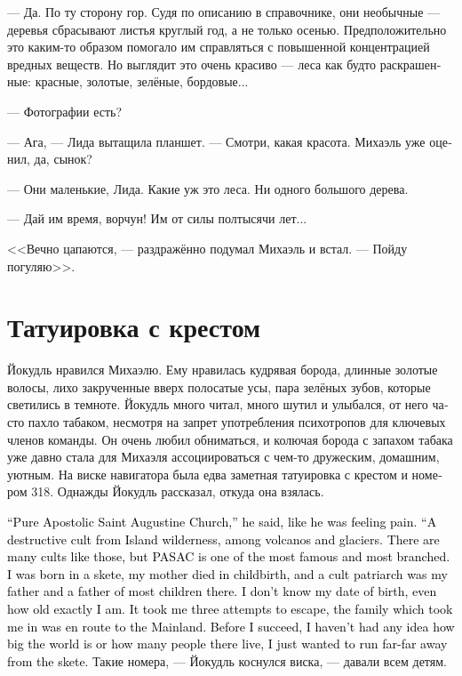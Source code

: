 \documentclass[a4paper,12pt,fleqn]{book}\usepackage{cooltooltips}\usepackage{polyglossia}\setdefaultlanguage[babelshorthands=true]{russian}\setotherlanguage{english}\defaultfontfeatures{Ligatures=TeX,Mapping=tex-text} \usepackage{xcolor}\definecolor{lightgray}{HTML}{bbbbbb}\color{lightgray}\newcommand{\ml}[3]{\textenglish{\textcolor{black}{#3}}}
\begin{document}
--- Да.
По ту сторону гор.
Судя по описанию в справочнике, они необычные --- деревья сбрасывают листья круглый год, а не только осенью.
Предположительно это каким-то образом помогало им справляться с повышенной концентрацией вредных веществ.
Но выглядит это очень красиво --- леса как будто раскрашенные: красные, золотые, зелёные, бордовые...

--- Фотографии есть?

--- Ага, --- Лида вытащила планшет.
--- Смотри, какая красота.
Михаэль уже оценил, да, сынок?

--- Они маленькие, Лида.
Какие уж это леса.
Ни одного большого дерева.

--- Дай им время, ворчун!
Им от силы полтысячи лет...

<<Вечно цапаются, --- раздражённо подумал Михаэль и встал.
--- Пойду погуляю>>.

\section{Татуировка с крестом}

Йокудль нравился Михаэлю.
Ему нравилась кудрявая борода, длинные золотые волосы, лихо закрученные вверх полосатые усы, пара зелёных зубов, которые светились в темноте.
Йокудль много читал, много шутил и улыбался, от него часто пахло табаком, несмотря на запрет употребления психотропов для ключевых членов команды.
Он очень любил обниматься, и колючая борода с запахом табака уже давно стала для Михаэля ассоциироваться с чем-то дружеским, домашним, уютным.
На виске навигатора была едва заметная татуировка с крестом и номером 318.
Однажды Йокудль рассказал, откуда она взялась.

\ml{$0$}
{--- Чистоапостольская Церковь Святого Августина, --- сказал он, поморщившись, словно от боли.}
{``Pure Apostolic Saint Augustine Church,'' he said, like he was feeling pain.}
\ml{$0$}
{--- Деструктивный культ в дикой местности Исланда, среди вулканов и ледников.}
{``A destructive cult from Island wilderness, among volcanos and glaciers.}
\ml{$0$}
{Таких культов достаточно много, но ЧАСАЦ --- один из самых известных и разветвлённых.}
{There are many cults like those, but PASAC is one of the most famous and most branched.}
\ml{$0$}
{Я родился в ските, моя мать умерла при родах, а биологическим отцом был глава культа, как и у большинства родившихся там.}
{I was born in a skete, my mother died in childbirth, and a cult patriarch was my father and a father of most children there.}
\ml{$0$}
{Я не знаю, когда я родился и сколько мне в точности лет.}
{I don't know my date of birth, even how old exactly I am.}
\ml{$0$}
{Сбежал с третьей попытки --- меня приютила семья, которая направлялась на Большую Землю.}
{It took me three attempts to escape, the family which took me in was en route to the Mainland.}
\ml{$0$}
{До побега я даже не знал, что вне поселения есть целый мир и множество людей, я просто хотел убежать подальше от скита.}
{Before I succeed, I haven't had any idea how big the world is or how many people there live, I just wanted to run far-far away from the skete.}
Такие номера, --- Йокудль коснулся виска, --- давали всем детям.
\end{document}
